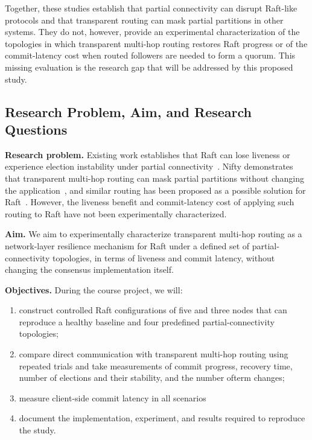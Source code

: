 \documentclass[11pt,a4paper]{article}
\begin{document}
Together, these studies establish that partial connectivity can disrupt Raft-like protocols and that transparent routing can mask partial partitions in other systems. 
They do not, however, provide an experimental characterization of the topologies in which transparent multi-hop routing restores Raft progress or of the commit-latency cost when routed followers are needed to form a quorum. 
This missing evaluation is the research gap that will be addressed by this proposed study.

\subsection{Research Problem, Aim, and Research Questions}

\textbf{Research problem.}
Existing work establishes that Raft can lose liveness or experience election instability under partial connectivity~\cite[Sec.~4]{jensen2021raft}. 
Nifty demonstrates that transparent multi-hop routing can mask partial partitions without changing the application~\cite[Secs.~6--7]{alfatafta2020nifty}, and similar routing has been proposed as a possible solution for Raft~\cite[Sec.~5]{jensen2021raft}. 
However, the liveness benefit and commit-latency cost of applying such routing to Raft have not been experimentally characterized.

\textbf{Aim.}
We aim to experimentally characterize transparent multi-hop routing as a network-layer resilience mechanism for Raft under a defined set of partial-connectivity topologies, in terms of liveness and commit latency, without changing the consensus implementation itself.

\textbf{Objectives.}
During the course project, we will:
\begin{enumerate}
  \item construct controlled Raft configurations of five and three nodes that can reproduce a healthy baseline and four predefined partial-connectivity topologies;
  \item compare direct communication with transparent multi-hop routing using repeated trials and take measurements of commit progress, recovery time, number of elections and their stability, and the number ofterm changes;
  \item measure client-side commit latency in all scenarios
  \item document the implementation, experiment, and results required to reproduce the study.
\end{enumerate}
\end{document}
